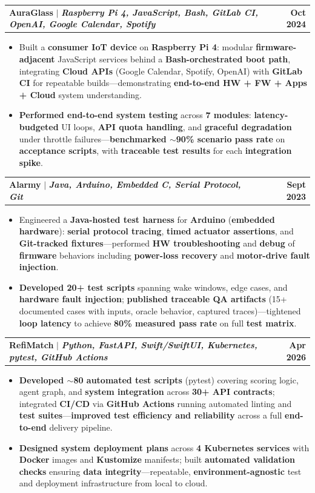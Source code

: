 \documentclass[letterpaper,10pt]{article}
\makeatletter
\newcommand{\resumeItem}[1]{
  \item\small{
    {#1 \vspace{-1pt}}
  }
}
\newcommand{\resumeProjectHeading}[2]{
    \item
    \begin{tabular*}{1.001\textwidth}{l@{\extracolsep{\fill}}r}
      \small#1 & \textbf{\small #2}\\
    \end{tabular*}\vspace{-9pt}
}
\newcommand{\resumeItemListStart}{\begin{itemize}[leftmargin=0.15in]}
\newcommand{\resumeItemListEnd}{\end{itemize}\vspace{-4pt}}
\makeatother
\begin{document}
    \resumeProjectHeading
          {\textbf{AuraGlass} $|$ \emph{\textbf{Raspberry Pi 4, JavaScript, Bash, GitLab CI, OpenAI, Google Calendar, Spotify}}}{Oct 2024}
    \resumeItemListStart
        \resumeItem{Built a \textbf{consumer IoT device} on \textbf{Raspberry Pi 4}: modular \textbf{firmware-adjacent} JavaScript services behind a \textbf{Bash-orchestrated boot path}, integrating \textbf{Cloud APIs} (Google Calendar, Spotify, OpenAI) with \textbf{GitLab CI} for repeatable builds---demonstrating \textbf{end-to-end HW + FW + Apps + Cloud} system understanding.}
        \vspace{-2pt}
        \resumeItem{\textbf{Performed end-to-end system testing} across \textbf{7 modules}: \textbf{latency-budgeted} UI loops, \textbf{API quota handling}, and \textbf{graceful degradation} under throttle failures---\textbf{benchmarked $\sim$90\% scenario pass rate} on \textbf{acceptance scripts}, with \textbf{traceable test results} for each \textbf{integration spike}.}
    \resumeItemListEnd
    \vspace{-18pt}

    \resumeProjectHeading
        {\textbf{Alarmy} $|$ \emph{\textbf{Java, Arduino, Embedded C, Serial Protocol, Git}}}{Sept 2023}
        \resumeItemListStart
            \resumeItem{Engineered a \textbf{Java-hosted test harness} for \textbf{Arduino} (\textbf{embedded hardware}): \textbf{serial protocol tracing}, \textbf{timed actuator assertions}, and \textbf{Git-tracked fixtures}---performed \textbf{HW troubleshooting} and \textbf{debug} of \textbf{firmware} behaviors including \textbf{power-loss recovery} and \textbf{motor-drive fault injection}.}
            \vspace{-2pt}
            \resumeItem{\textbf{Developed 20+ test scripts} spanning wake windows, edge cases, and \textbf{hardware fault injection}; \textbf{published traceable QA artifacts} (15+ documented cases with inputs, oracle behavior, captured traces)---tightened \textbf{loop latency} to achieve \textbf{80\% measured pass rate} on full \textbf{test matrix}.}
        \resumeItemListEnd
    \vspace{-18pt}

    \resumeProjectHeading
        {\textbf{RefiMatch} $|$ \emph{\textbf{Python, FastAPI, Swift/SwiftUI, Kubernetes, pytest, GitHub Actions}}}{Apr 2026}
        \resumeItemListStart
            \resumeItem{\textbf{Developed $\sim$80 automated test scripts} (pytest) covering scoring logic, agent graph, and \textbf{system integration} across \textbf{30+ API contracts}; integrated \textbf{CI/CD} via \textbf{GitHub Actions} running automated linting and \textbf{test suites}---\textbf{improved test efficiency and reliability} across a full \textbf{end-to-end} delivery pipeline.}
            \vspace{-2pt}
            \resumeItem{\textbf{Designed system deployment plans} across \textbf{4 Kubernetes services} with \textbf{Docker} images and \textbf{Kustomize} manifests; built \textbf{automated validation checks} ensuring \textbf{data integrity}---repeatable, \textbf{environment-agnostic} test and deployment infrastructure from local to cloud.}
        \resumeItemListEnd
    \vspace{-8pt}
\end{document}
